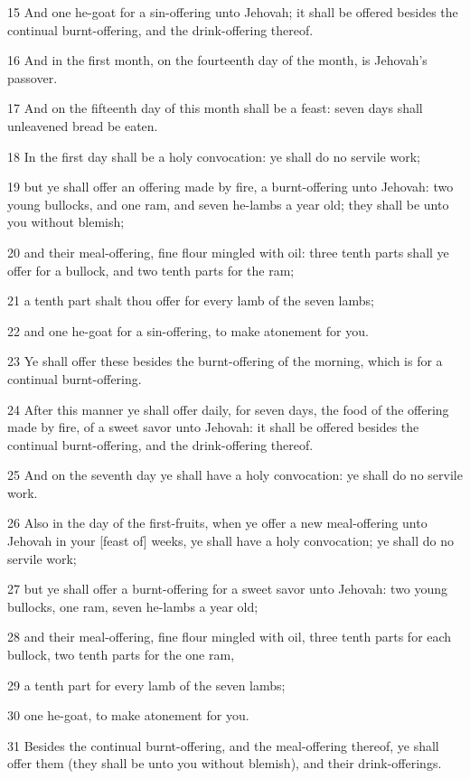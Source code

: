 \par 15 And one he-goat for a sin-offering unto Jehovah; it shall be offered besides the continual burnt-offering, and the drink-offering thereof.
\par 16 And in the first month, on the fourteenth day of the month, is Jehovah's passover.
\par 17 And on the fifteenth day of this month shall be a feast: seven days shall unleavened bread be eaten.
\par 18 In the first day shall be a holy convocation: ye shall do no servile work;
\par 19 but ye shall offer an offering made by fire, a burnt-offering unto Jehovah: two young bullocks, and one ram, and seven he-lambs a year old; they shall be unto you without blemish;
\par 20 and their meal-offering, fine flour mingled with oil: three tenth parts shall ye offer for a bullock, and two tenth parts for the ram;
\par 21 a tenth part shalt thou offer for every lamb of the seven lambs;
\par 22 and one he-goat for a sin-offering, to make atonement for you.
\par 23 Ye shall offer these besides the burnt-offering of the morning, which is for a continual burnt-offering.
\par 24 After this manner ye shall offer daily, for seven days, the food of the offering made by fire, of a sweet savor unto Jehovah: it shall be offered besides the continual burnt-offering, and the drink-offering thereof.
\par 25 And on the seventh day ye shall have a holy convocation: ye shall do no servile work.
\par 26 Also in the day of the first-fruits, when ye offer a new meal-offering unto Jehovah in your [feast of] weeks, ye shall have a holy convocation; ye shall do no servile work;
\par 27 but ye shall offer a burnt-offering for a sweet savor unto Jehovah: two young bullocks, one ram, seven he-lambs a year old;
\par 28 and their meal-offering, fine flour mingled with oil, three tenth parts for each bullock, two tenth parts for the one ram,
\par 29 a tenth part for every lamb of the seven lambs;
\par 30 one he-goat, to make atonement for you.
\par 31 Besides the continual burnt-offering, and the meal-offering thereof, ye shall offer them (they shall be unto you without blemish), and their drink-offerings.

